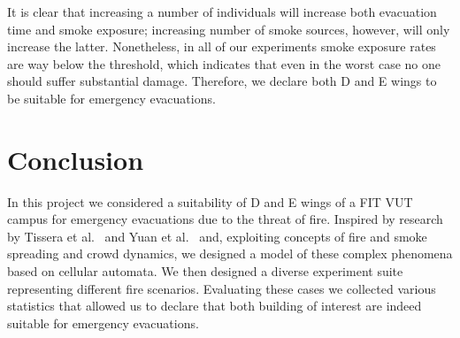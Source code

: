 It is clear that increasing a number of individuals will increase both
evacuation time and smoke exposure; increasing number of smoke sources, however,
will only increase the latter.
Nonetheless, in all of our experiments smoke exposure rates are way below the
threshold, which indicates that even in the worst case no one should suffer
substantial damage.
Therefore, we declare both D and E wings to be suitable for emergency
evacuations.

\section{Conclusion}
In this project we considered a suitability of D and E wings of a FIT VUT campus
for emergency evacuations due to the threat of fire.
Inspired by research by Tissera et al.~\cite{Tissera1, Tissera2} and
Yuan et al.~\cite{Yuan} and, exploiting concepts of fire and smoke spreading and
crowd dynamics, we designed a model of these complex phenomena based on
cellular automata.
We then designed a diverse experiment suite representing different fire
scenarios.
Evaluating these cases we collected various statistics that allowed us to
declare that both building of interest are indeed suitable for emergency
evacuations.
